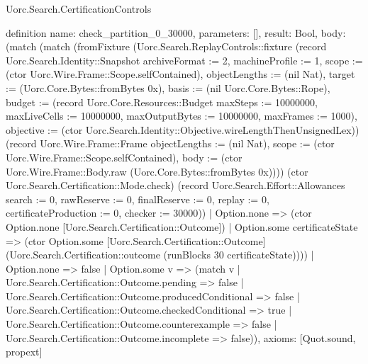\begin{lexlean}{Uorc.Search.CertificationControls}
\begin{semanticmodule}
definition{
  name: check_partition_0_30000,
  parameters: [],
  result: Bool,
  body: (match (match (fromFixture (Uorc.Search.ReplayControls::fixture (record Uorc.Search.Identity::Snapshot {archiveFormat := 2, machineProfile := 1, scope := (ctor Uorc.Wire.Frame::Scope.selfContained), objectLengths := (nil Nat), target := (Uorc.Core.Bytes::fromBytes 0x), basis := (nil Uorc.Core.Bytes::Rope), budget := (record Uorc.Core.Resources::Budget {maxSteps := 10000000, maxLiveCells := 10000000, maxOutputBytes := 10000000, maxFrames := 1000}), objective := (ctor Uorc.Search.Identity::Objective.wireLengthThenUnsignedLex)}) (record Uorc.Wire.Frame::Frame {objectLengths := (nil Nat), scope := (ctor Uorc.Wire.Frame::Scope.selfContained), body := (ctor Uorc.Wire.Frame::Body.raw (Uorc.Core.Bytes::fromBytes 0x))})) (ctor Uorc.Search.Certification::Mode.check) (record Uorc.Search.Effort::Allowances {search := 0, rawReserve := 0, finalReserve := 0, replay := 0, certificateProduction := 0, checker := 30000}))
      | Option.none => (ctor Option.none [Uorc.Search.Certification::Outcome])
      | Option.some certificateState => (ctor Option.some [Uorc.Search.Certification::Outcome] (Uorc.Search.Certification::outcome (runBlocks 30 certificateState))))
    | Option.none => false
    | Option.some v => (match v
      | Uorc.Search.Certification::Outcome.pending => false
      | Uorc.Search.Certification::Outcome.producedConditional => false
      | Uorc.Search.Certification::Outcome.checkedConditional => true
      | Uorc.Search.Certification::Outcome.counterexample => false
      | Uorc.Search.Certification::Outcome.incomplete => false)),
  axioms: [Quot.sound, propext]
}


\end{semanticmodule}
\end{lexlean}
